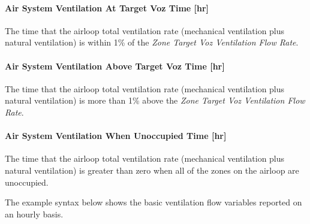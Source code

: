 \paragraph{Air System Ventilation At Target Voz Time {[}hr{]}}\label{air-system-ventilation-at-target-voz-time}
The time that the airloop total ventilation rate (mechanical ventilation plus natural ventilation) is within 1\% of the \emph{Zone Target Voz Ventilation Flow Rate}.

\paragraph{Air System Ventilation Above Target Voz Time {[}hr{]}}\label{air-system-ventilation-above-target-voz-time}
The time that the airloop total ventilation rate (mechanical ventilation plus natural ventilation) is more than 1\% above the \emph{Zone Target Voz Ventilation Flow Rate}.

\paragraph{Air System Ventilation When Unoccupied Time {[}hr{]}}\label{air-system-ventilation-when-unoccupied-time}
The time that the airloop total ventilation rate (mechanical ventilation plus natural ventilation) is greater than zero when all of the zones on the airloop are unoccupied.



The example syntax below shows the basic ventilation flow variables reported on an hourly basis.

